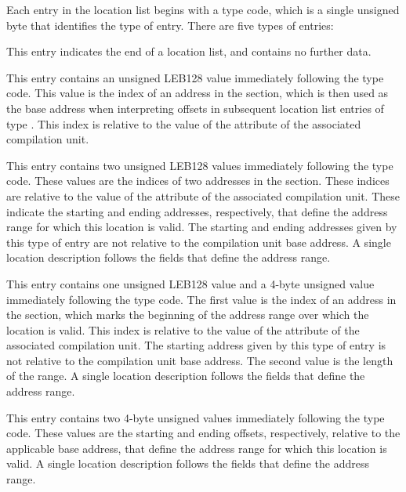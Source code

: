 Each entry in the location list
begins with a type code, which is a single unsigned byte that
identifies the type of entry. There are five types of entries:
\begin{enumerate}
\itembfnl{\DWLLEendoflistentryTARG}
This entry indicates the end of a location list, and
contains no further data.

\itembfnl{\DWLLEbaseaddressselectionentryTARG}
This entry contains an 
unsigned LEB128 value immediately
following the type code. This value is the index of an
address in the \dotdebugaddr{} section, which is then used as
the base address when interpreting offsets in subsequent
location list entries of type \DWLLEoffsetpairentry.
This index is relative to the value of the 
\DWATaddrbase{} attribute of the associated compilation unit.

\itembfnl{\DWLLEstartendentryTARG}
This entry contains two unsigned LEB128
values immediately following the type code. These values are the
indices of two addresses in the \dotdebugaddr{} section.
These indices are relative to the value of the 
\DWATaddrbase{} attribute of the associated compilation unit.
These indicate the starting and ending addresses,
respectively, that define the address range for which
this location is valid. The starting and ending addresses
given by this type of entry are not relative to the
compilation unit base address. A single location
description follows the fields that define the address range.

\itembfnl{\DWLLEstartlengthentryTARG}
This entry contains one unsigned LEB128
value and a 4-byte
unsigned value immediately following the type code. The
first value is the index of an address in the \dotdebugaddr{}
section, which marks the beginning of the address range
over which the location is valid.
This index is relative to the value of the 
\DWATaddrbase{} attribute of the associated compilation unit.
The starting address given by this
type of entry is not relative to the compilation unit
base address. The second value is the
length of the range. A single location
description follows the fields that define the address range.

\itembfnl{\DWLLEoffsetpairentryTARG}
This entry contains two 4-byte unsigned values
immediately following the type code. These values are the
starting and ending offsets, respectively, relative to
the applicable base address, that define the address
range for which this location is valid. A single location
description follows the fields that define the address range.
\end{enumerate}

